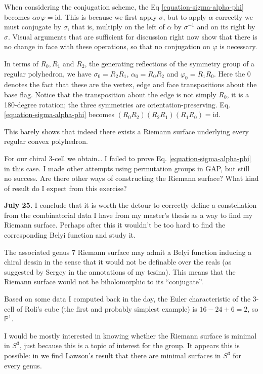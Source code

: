 When considering the conjugation scheme, the Eq \ref{equation-sigma-alpha-phi}
becomes $\alpha\sigma\varphi=\text{id}$. This is because we first apply
$\sigma$, but to apply $\alpha$ correctly we must conjugate by $\sigma$, that
is, multiply on the left of $\alpha$ by $\sigma^{-1}$ and on its right by
$\sigma$. Visual arguments that are sufficient for discussion right now show
that there is no change in face with these operations, so that no conjugation on
$\varphi$ is necessary.

In terms of $R_0,R_1$ and $R_2$, the generating reflections of the symmetry
group of a regular polyhedron, we have $\sigma_0=R_2R_1$, $\alpha_0=R_0R_2$ and
$\varphi_0=R_1R_0$. Here the $0$ denotes the fact that these are the vertex,
edge and face transpositions about the base flag. Notice that the transposition
about the edge is not simply $R_0$, it is a 180-degree rotation; the three
symmetries are orientation-preserving. Eq. \ref{equation-sigma-alpha-phi}
becomes $(R_0R_2)(R_2R_1)(R_1R_0)=\text{id}$.

This barely shows that indeed
there exists a Riemann surface underlying every regular convex polyhedron.

For our chiral 3-cell we obtain… I failed to prove Eq.
\ref{equation-sigma-alpha-phi} in this case. I made other attempts using
permutation groups in GAP, but still no success. Are there other ways of
constructing the Riemann surface? What kind of result do I expect from this
exercise?

{\bf July 25.} I conclude that it is worth the detour to correctly define a
constellation from the combinatorial data I have from my master's thesis as a
way to find my Riemann surface. Perhaps after this it wouldn't be too hard to
find the corresponding Belyi function and study it.

\bigskip\noindent

The associated genus $7$ Riemann surface may admit
a Belyi function inducing a chiral dessin in the sense that it would not be
definable over the reals (as suggested by Sergey in the annotations of my
tesina). This means that the Riemann surface would not be biholomorphic to its
``conjugate''.

Based on some data I computed back in the day, the Euler
characteristic of the 3-cell of Roli's cube (the first and probably simplest
example) is $16-24+6=2$, so $\mathbb{P}^1$.

I would be mostly interested in knowing whether the Riemann surface is minimal
in $S^3$, just because this is a topic of interest for the group. It appears
this is possible: in \cite[Theorem 2.1]{brendle} we find Lawson's result that
there are minimal surfaces in $S^3$ for every genus.

